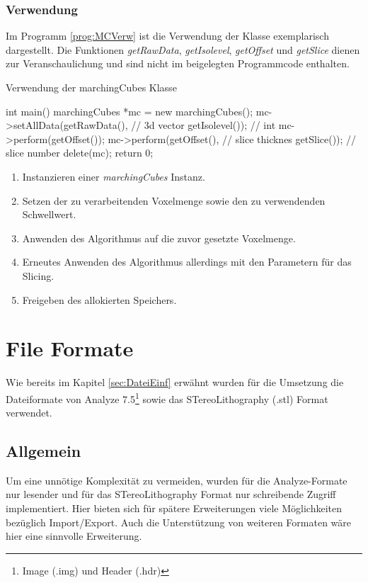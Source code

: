 \subsubsection{Verwendung}
Im Programm \ref{prog:MCVerw} ist die Verwendung der Klasse exemplarisch dargestellt. Die Funktionen \textit{getRawData}, \textit{getIsolevel}, \textit{getOffset} und \textit{getSlice} dienen zur Veranschaulichung und sind nicht im beigelegten Programmcode enthalten. 
\begin{program}[H]
	\caption{Verwendung der marchingCubes Klasse}
	\label{prog:MCVerw}
	\begin{CCode}
		int main(){
			marchingCubes *mc = new marchingCubes();		
			mc->setAllData(getRawData(),   // 3d vector  
						   getIsolevel()); // int
			mc->perform(getOffset()); 
			mc->perform(getOffset(), // slice thicknes 
						getSlice()); // slice number
			delete(mc);
			return 0;	
		}
	\end{CCode}
\end{program}
\begin{enumerate}
	\item Instanzieren einer \textit{marchingCubes} Instanz.
	\item Setzen der zu verarbeitenden Voxelmenge sowie den zu verwendenden Schwellwert.
	\item Anwenden des Algorithmus auf die zuvor gesetzte Voxelmenge. 
	\item Erneutes Anwenden des Algorithmus allerdings mit den Parametern für das Slicing.
	\item Freigeben des allokierten Speichers.
\end{enumerate}
\section{File Formate}
Wie bereits im Kapitel \ref{sec:DateiEinf} erwähnt wurden für die Umsetzung die Dateiformate von Analyze 7.5\footnote{Image (.img) und Header (.hdr)} sowie das STereoLithography (.stl) Format verwendet.
\subsection{Allgemein}
Um eine unnötige Komplexität zu vermeiden, wurden für die Analyze-Formate nur lesender und für das STereoLithography Format nur schreibende Zugriff implementiert. Hier bieten sich für spätere Erweiterungen viele Möglichkeiten bezüglich Import/Export. Auch die Unterstützung von weiteren Formaten wäre hier eine sinnvolle Erweiterung. 

